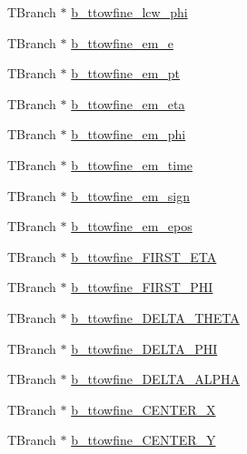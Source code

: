 \begin{DoxyCompactItemize}
\item 
T\+Branch $\ast$ \hyperlink{classJetAnalysisExample_ab631b6578c9f3c95ec182ce6e499056f}{b\+\_\+ttowfine\+\_\+lcw\+\_\+phi}
\item 
T\+Branch $\ast$ \hyperlink{classJetAnalysisExample_a9849161366dd57d4ac90c1aa77f80f1b}{b\+\_\+ttowfine\+\_\+em\+\_\+e}
\item 
T\+Branch $\ast$ \hyperlink{classJetAnalysisExample_a2a6c697d8b13129248cde4a7f22c17ca}{b\+\_\+ttowfine\+\_\+em\+\_\+pt}
\item 
T\+Branch $\ast$ \hyperlink{classJetAnalysisExample_acc47dfd2d1950fcf3d0b560f4e228e2f}{b\+\_\+ttowfine\+\_\+em\+\_\+eta}
\item 
T\+Branch $\ast$ \hyperlink{classJetAnalysisExample_ae71147868276cd3e94d66a614711cd4e}{b\+\_\+ttowfine\+\_\+em\+\_\+phi}
\item 
T\+Branch $\ast$ \hyperlink{classJetAnalysisExample_a1ee8e5d9f77ac72cc689a9c3f9b177e9}{b\+\_\+ttowfine\+\_\+em\+\_\+time}
\item 
T\+Branch $\ast$ \hyperlink{classJetAnalysisExample_afdf886fb38e4e80d4a2f2b390e4879d5}{b\+\_\+ttowfine\+\_\+em\+\_\+sign}
\item 
T\+Branch $\ast$ \hyperlink{classJetAnalysisExample_acc836e9c8bba2c47b5fc55d47dfec1b8}{b\+\_\+ttowfine\+\_\+em\+\_\+epos}
\item 
T\+Branch $\ast$ \hyperlink{classJetAnalysisExample_a67f0fe2c97bcc6a29906356d75d90430}{b\+\_\+ttowfine\+\_\+\+F\+I\+R\+S\+T\+\_\+\+E\+TA}
\item 
T\+Branch $\ast$ \hyperlink{classJetAnalysisExample_aac987ff141f25406e9822c738bf315e2}{b\+\_\+ttowfine\+\_\+\+F\+I\+R\+S\+T\+\_\+\+P\+HI}
\item 
T\+Branch $\ast$ \hyperlink{classJetAnalysisExample_ae78970533255dd2eb2a1234134e1f499}{b\+\_\+ttowfine\+\_\+\+D\+E\+L\+T\+A\+\_\+\+T\+H\+E\+TA}
\item 
T\+Branch $\ast$ \hyperlink{classJetAnalysisExample_aee0406c9b8d4aa8cf4078aa559844603}{b\+\_\+ttowfine\+\_\+\+D\+E\+L\+T\+A\+\_\+\+P\+HI}
\item 
T\+Branch $\ast$ \hyperlink{classJetAnalysisExample_a4f5e520bfb067524408ee062d6912539}{b\+\_\+ttowfine\+\_\+\+D\+E\+L\+T\+A\+\_\+\+A\+L\+P\+HA}
\item 
T\+Branch $\ast$ \hyperlink{classJetAnalysisExample_a56b27ce3e9050fd53ec5808f9aa2e773}{b\+\_\+ttowfine\+\_\+\+C\+E\+N\+T\+E\+R\+\_\+X}
\item 
T\+Branch $\ast$ \hyperlink{classJetAnalysisExample_a0b751d8ec7bc243e77da5984cf19bd9a}{b\+\_\+ttowfine\+\_\+\+C\+E\+N\+T\+E\+R\+\_\+Y}

\end{DoxyCompactItemize}
